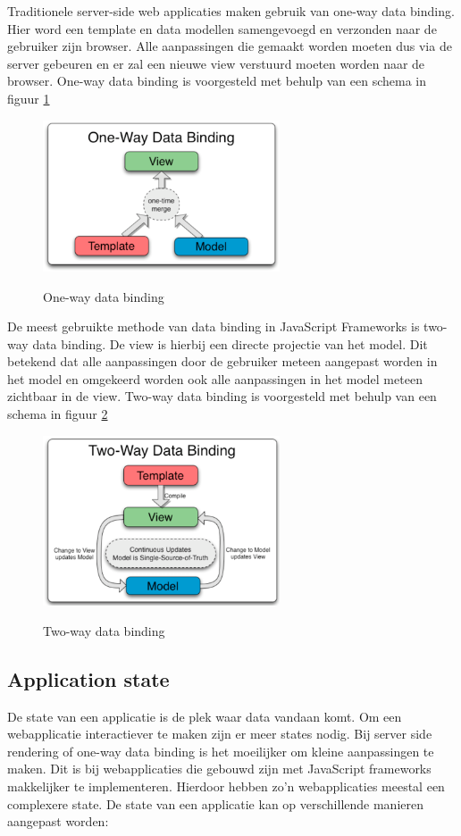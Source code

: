 Traditionele server-side web applicaties maken gebruik van one-way data binding. Hier word een template en data modellen samengevoegd en verzonden naar de gebruiker zijn browser. Alle aanpassingen die gemaakt worden moeten dus via de server gebeuren en er zal een nieuwe view verstuurd moeten worden naar de browser. One-way data binding is voorgesteld met behulp van een schema in figuur \ref{fig:one_way_data_binding}

\begin{figure}[h!]
	\caption{One-way data binding \autocite{_data_????}}
	\centering
	\includegraphics[width=7cm]{img/onewaydatabinding.png}
	\label{fig:one_way_data_binding}
\end{figure}

De meest gebruikte methode van data binding in JavaScript Frameworks is two-way data binding. De view is hierbij een directe projectie van het model. Dit betekend dat alle aanpassingen door de gebruiker meteen aangepast worden in het model en omgekeerd worden ook alle aanpassingen in het model meteen zichtbaar in de view. Two-way data binding is voorgesteld met behulp van een schema in figuur \ref{fig:two_way_data_binding}

\begin{figure}[h!]
	\caption{Two-way data binding \autocite{_data_????}}
	\centering
	\includegraphics[width=7cm]{img/twowaydatabinding.png}
	\label{fig:two_way_data_binding}
\end{figure}

\subsection{Application state}
\label{sec:Application_state}
De state van een applicatie is de plek waar data vandaan komt. Om een webapplicatie interactiever te maken zijn er meer states nodig. Bij server side rendering of one-way data binding is het moeilijker om kleine aanpassingen te maken. Dit is bij webapplicaties die gebouwd zijn met JavaScript frameworks makkelijker te implementeren. Hierdoor hebben zo’n webapplicaties meestal een complexere state. De state van een applicatie kan op verschillende manieren aangepast worden:


